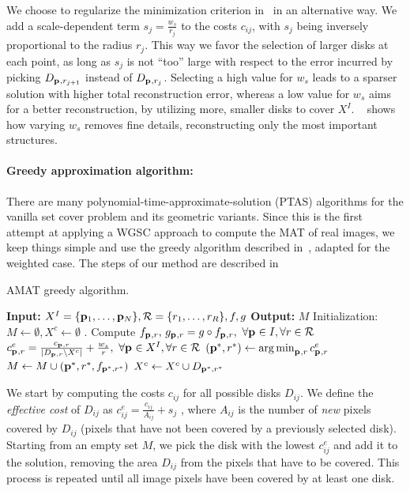 \documentclass[10pt,twocolumn,letterpaper]{article}
\begin{document}
We choose to regularize the minimization criterion in~ in an alternative way. 
We add a scale-dependent term $s_j = \frac{w_s}{r_j}$ to the costs $c_{ij}$, with $s_j$ 
being inversely proportional to the radius $r_j$.
This way we favor the selection of larger disks at each point, as long as $s_j$ is not ``too'' large
with respect to the error incurred by picking $D_{\mathbf{p}_{},r_{j+1}}$ instead of $D_{\mathbf{p}_{},r_j}$.
Selecting a high value for $w_s$ leads to a sparser solution with higher total reconstruction error,
whereas a low value for $w_s$ aims for a better reconstruction, by utilizing more, smaller disks
to cover $X^I$.
~ shows how varying $w_s$ removes fine details, reconstructing only the most important structures.

\paragraph{Greedy approximation algorithm:}
There are many polynomial-time-approximate-solution (PTAS) algorithms for the vanilla set cover problem
and its geometric variants.
Since this is the first attempt at applying a WGSC approach to compute the MAT of real images, we keep things simple
and use the greedy algorithm described in~\cite{vazirani2013approximation}, adapted for the weighted case.
The steps of our method are described in~
\begin{algorithm}[t]
\caption{AMAT greedy algorithm.}
\label{alg:greedy}
	\begin{algorithmic}[1]
	\Statex \textbf{Input:} $X^I=\{\mathbf{p}_{1},\ldots,\mathbf{p}_{N}\},\mathcal{R}=\{r_1,\ldots,r_R\},f,g$
	\Statex \textbf{Output:} $M$
	\State Initialization: $M \leftarrow \emptyset,X^c \leftarrow \emptyset$ .
	\State Compute $f_{\mathbf{p}_{},r},\, g_{\mathbf{p}_{},r} = g \circ f_{\mathbf{p}_{},r},\,\, \forall \mathbf{p}_{} \in I, \forall r \in \mathcal{R}$
		\State $c_{\mathbf{p}_{},r}^e = \frac{c_{\mathbf{p}_{},r}}{|D_{\mathbf{p}_{},r} \setminus X^c|}+\frac{w_s}{r},\,\, \forall \mathbf{p}_{} \in X^I, \forall r \in \mathcal{R}$
		\State $(\mathbf{p}_{}^{*},r^{*}) \leftarrow \operatorname*{arg\,min}_{\mathbf{p}_{},r}{c_{\mathbf{p}_{},r}^e}$		
		\State $M\leftarrow M\cup{(\mathbf{p}_{}^{*},r^{*},f_{\mathbf{p}_{}^{*},r^{*}})}$
		\State $X^c \leftarrow X^c \cup D_{\mathbf{p}_{}^{*},r^{*}}$ 
	\EndWhile
	\end{algorithmic}
\end{algorithm}
We start by computing the costs $c_{ij}$ for all possible disks $D_{ij}$.
We define the \emph{effective cost} of $D_{ij}$ as $c_{ij}^e = \frac{c_{ij}}{A_{ij}} + s_j$ , where $A_{ij}$ is the number
of \emph{new} pixels covered by $D_{ij}$ (pixels that have not been covered by a previously selected disk).
Starting from an empty set $M$, we pick the disk with the lowest $c_{ij}^e$ and add it to the solution, 
removing the area $D_{ij}$ from the pixels that have to be covered.
This process is repeated until all image pixels have been covered by at least one disk.
\end{document}

